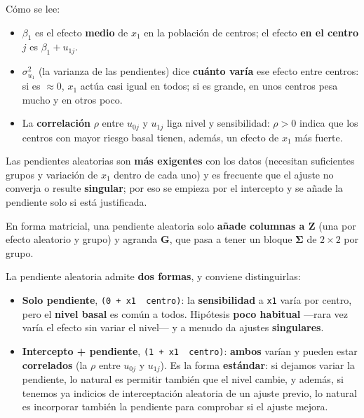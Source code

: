 \documentclass[
  letterpaper,
  DIV=11,
  numbers=noendperiod]{scrartcl}
\providecommand{\tightlist}{%
  \setlength{\itemsep}{0pt}\setlength{\parskip}{0pt}}\usepackage{longtable,booktabs,array}
\begin{document}
Cómo se lee:

\begin{itemize}
\tightlist
\item
  \(\beta_1\) es el efecto \textbf{medio} de \(x_1\) en la población de
  centros; el efecto \textbf{en el centro \(j\)} es \(\beta_1+u_{1j}\).
\item
  \(\sigma_{u_1}^2\) (la varianza de las pendientes) dice \textbf{cuánto
  varía} ese efecto entre centros: si es \(\approx 0\), \(x_1\) actúa
  casi igual en todos; si es grande, en unos centros pesa mucho y en
  otros poco.
\item
  La \textbf{correlación} \(\rho\) entre \(u_{0j}\) y \(u_{1j}\) liga
  nivel y sensibilidad: \(\rho>0\) indica que los centros con mayor
  riesgo basal tienen, además, un efecto de \(x_1\) más fuerte.
\end{itemize}

Las pendientes aleatorias son \textbf{más exigentes} con los datos
(necesitan suficientes grupos y variación de \(x_1\) dentro de cada uno)
y es frecuente que el ajuste no converja o resulte \textbf{singular};
por eso se empieza por el intercepto y se añade la pendiente solo si
está justificada.

En forma matricial, una pendiente aleatoria solo \textbf{añade columnas
a \(\mathbf{Z}\)} (una por efecto aleatorio y grupo) y agranda
\(\mathbf{G}\), que pasa a tener un bloque \(\boldsymbol\Sigma\) de
\(2\times2\) por grupo.

La pendiente aleatoria admite \textbf{dos formas}, y conviene
distinguirlas:

\begin{itemize}
\tightlist
\item
  \textbf{Solo pendiente}, \texttt{(0\ +\ x1\ \textbar{}\ centro)}: la
  \textbf{sensibilidad} a \texttt{x1} varía por centro, pero el
  \textbf{nivel basal} es común a todos. Hipótesis \textbf{poco
  habitual} ---rara vez varía el efecto sin variar el nivel--- y a
  menudo da ajustes \textbf{singulares}.
\item
  \textbf{Intercepto + pendiente},
  \texttt{(1\ +\ x1\ \textbar{}\ centro)}: \textbf{ambos} varían y
  pueden estar \textbf{correlados} (la \(\rho\) entre \(u_{0j}\) y
  \(u_{1j}\)). Es la forma \textbf{estándar}: si dejamos variar la
  pendiente, lo natural es permitir también que el nivel cambie, y
  además, si tenemos ya indicios de interceptación aleatoria de un
  ajuste previo, lo natural es incorporar también la pendiente para
  comprobar si el ajuste mejora.
\end{itemize}
\end{document}
